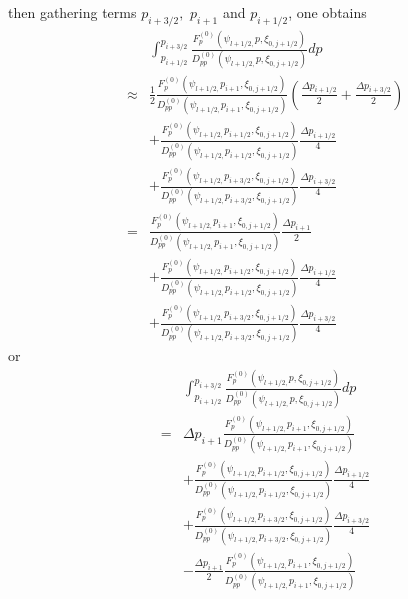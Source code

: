 then gathering terms $p_{i+3/2},$ $p_{i+1}$ and $p_{i+1/2}$, one obtains
\begin{eqnarray}
&&\int_{p_{i+1/2}}^{p_{i+3/2}}\frac{F_{p}^{\left( 0\right) }\left( \psi
_{l+1/2,}p,\xi _{0,j+1/2}\right) }{D_{pp}^{\left( 0\right) }\left( \psi
_{l+1/2,}p,\xi _{0,j+1/2}\right) }dp  \nonumber \\
&\approx &\frac{1}{2}\frac{F_{p}^{\left( 0\right) }\left( \psi
_{l+1/2,}p_{i+1},\xi _{0,j+1/2}\right) }{D_{pp}^{\left( 0\right) }\left(
\psi _{l+1/2,}p_{i+1},\xi _{0,j+1/2}\right) }\left( \frac{\Delta p_{i+1/2}}{2%
}+\frac{\Delta p_{i+3/2}}{2}\right)  \nonumber \\
&&+\frac{F_{p}^{\left( 0\right) }\left( \psi _{l+1/2,}p_{i+1/2},\xi
_{0,j+1/2}\right) }{D_{pp}^{\left( 0\right) }\left( \psi
_{l+1/2,}p_{i+1/2},\xi _{0,j+1/2}\right) }\frac{\Delta p_{i+1/2}}{4}
\nonumber \\
&&+\frac{F_{p}^{\left( 0\right) }\left( \psi _{l+1/2,}p_{i+3/2},\xi
_{0,j+1/2}\right) }{D_{pp}^{\left( 0\right) }\left( \psi
_{l+1/2,}p_{i+3/2},\xi _{0,j+1/2}\right) }\frac{\Delta p_{i+3/2}}{4}
\nonumber \\
&=&\frac{F_{p}^{\left( 0\right) }\left( \psi _{l+1/2,}p_{i+1},\xi
_{0,j+1/2}\right) }{D_{pp}^{\left( 0\right) }\left( \psi
_{l+1/2,}p_{i+1},\xi _{0,j+1/2}\right) }\frac{\Delta p_{i+1}}{2}  \nonumber
\\
&&+\frac{F_{p}^{\left( 0\right) }\left( \psi _{l+1/2,}p_{i+1/2},\xi
_{0,j+1/2}\right) }{D_{pp}^{\left( 0\right) }\left( \psi
_{l+1/2,}p_{i+1/2},\xi _{0,j+1/2}\right) }\frac{\Delta p_{i+1/2}}{4}
\nonumber \\
&&+\frac{F_{p}^{\left( 0\right) }\left( \psi _{l+1/2,}p_{i+3/2},\xi
_{0,j+1/2}\right) }{D_{pp}^{\left( 0\right) }\left( \psi
_{l+1/2,}p_{i+3/2},\xi _{0,j+1/2}\right) }\frac{\Delta p_{i+3/2}}{4}
\end{eqnarray}
or
\begin{eqnarray}
&&\int_{p_{i+1/2}}^{p_{i+3/2}}\frac{F_{p}^{\left( 0\right) }\left( \psi
_{l+1/2,}p,\xi _{0,j+1/2}\right) }{D_{pp}^{\left( 0\right) }\left( \psi
_{l+1/2,}p,\xi _{0,j+1/2}\right) }dp  \nonumber \\
&=&\Delta p_{i+1}\frac{F_{p}^{\left( 0\right) }\left( \psi
_{l+1/2,}p_{i+1},\xi _{0,j+1/2}\right) }{D_{pp}^{\left( 0\right) }\left(
\psi _{l+1/2,}p_{i+1},\xi _{0,j+1/2}\right) }  \nonumber \\
&&+\frac{F_{p}^{\left( 0\right) }\left( \psi _{l+1/2,}p_{i+1/2},\xi
_{0,j+1/2}\right) }{D_{pp}^{\left( 0\right) }\left( \psi
_{l+1/2,}p_{i+1/2},\xi _{0,j+1/2}\right) }\frac{\Delta p_{i+1/2}}{4}
\nonumber \\
&&+\frac{F_{p}^{\left( 0\right) }\left( \psi _{l+1/2,}p_{i+3/2},\xi
_{0,j+1/2}\right) }{D_{pp}^{\left( 0\right) }\left( \psi
_{l+1/2,}p_{i+3/2},\xi _{0,j+1/2}\right) }\frac{\Delta p_{i+3/2}}{4}
\nonumber \\
&&-\frac{\Delta p_{i+1}}{2}\frac{F_{p}^{\left( 0\right) }\left( \psi
_{l+1/2,}p_{i+1},\xi _{0,j+1/2}\right) }{D_{pp}^{\left( 0\right) }\left(
\psi _{l+1/2,}p_{i+1},\xi _{0,j+1/2}\right) }
\end{eqnarray}

